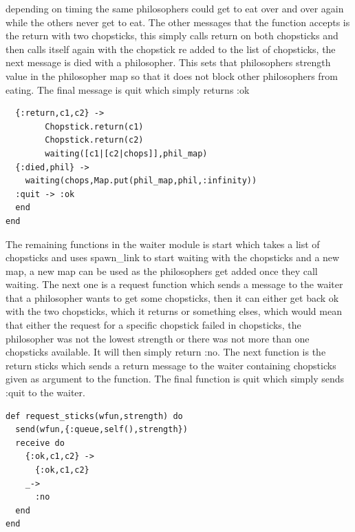 \documentclass[a4paper,11pt]{article}
\begin{document}
depending on timing the same philosophers could get to eat over and over again while the others never get to eat. 
The other messages that the function accepts is the return with two chopsticks, this simply calls return on both chopsticks and then calls itself again with the chopstick re added to the list of chopsticks, 
the next message is died with a philosopher. This sets that philosophers strength value in the philosopher map so that it does not block other philosophers from eating.
The final message is quit which simply returns :ok
\begin{verbatim}
  {:return,c1,c2} ->
        Chopstick.return(c1)
        Chopstick.return(c2)
        waiting([c1|[c2|chops]],phil_map)
  {:died,phil} ->
    waiting(chops,Map.put(phil_map,phil,:infinity))
  :quit -> :ok
  end
end
\end{verbatim}
The remaining functions in the waiter module is start which takes a list of chopsticks and uses spawn\_link to start waiting with the chopsticks and a new map, a new map can be used as the philosophers get added once they call waiting.
The next one is a request function which sends a message to the waiter that a philosopher wants to get some chopsticks, then it can either get back ok with the two chopsticks, which it returns or something elses, which would mean that either the request for a specific chopstick failed in chopsticks, the philosopher was not the lowest strength or there was not more than one chopsticks available.
It will then simply return :no. The next function is the return sticks which sends a return message to the waiter containing chopsticks given as argument to the function.
The final function is quit which simply sends :quit to the waiter.
\begin{verbatim}
def request_sticks(wfun,strength) do
  send(wfun,{:queue,self(),strength})
  receive do
    {:ok,c1,c2} ->
      {:ok,c1,c2}
    _->
      :no
  end
end
\end{verbatim}
\end{document}
